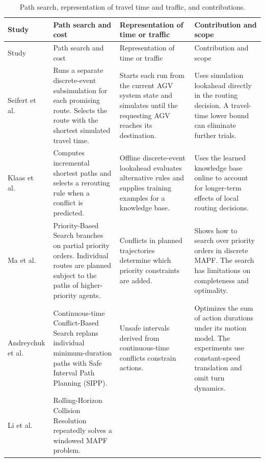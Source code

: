 \documentclass[11pt]{article}
\begin{document}
\small
\setlength{\tabcolsep}{4pt}
\begin{longtable}{@{}>{\raggedright\arraybackslash}p{.16\linewidth}
                    >{\raggedright\arraybackslash}p{.30\linewidth}
                    >{\raggedright\arraybackslash}p{.25\linewidth}
                    >{\raggedright\arraybackslash}p{.23\linewidth}@{}}
\caption{Path search, representation of travel time and traffic, and contributions.}
\label{tab:related-work}\\
\toprule
Study & Path search and cost & Representation of time or traffic & Contribution and scope \\
\midrule
\endfirsthead
\toprule
Study & Path search and cost & Representation of time or traffic & Contribution and scope \\
\midrule
\endhead
\bottomrule
\endfoot
Seifert et al.\ \cite{seifert1995} &
Runs a separate discrete-event subsimulation for each promising route.
Selects the route with the shortest simulated travel time. &
Starts each run from the current AGV system state and simulates
until the requesting AGV reaches its destination. &
Uses simulation lookahead directly in the routing decision.
A travel-time lower bound can eliminate further trials. \\ \addlinespace
Klaas et al.\ \cite{klaas2011} &
Computes incremental shortest paths and selects a rerouting rule
when a conflict is predicted. &
Offline discrete-event lookahead evaluates alternative rules
and supplies training examples for a knowledge base. &
Uses the learned knowledge base online to account for longer-term
effects of local routing decisions. \\ \addlinespace
Ma et al.\ \cite{ma2019} &
Priority-Based Search branches on partial priority orders. Individual routes
are planned subject to the paths of higher-priority agents. &
Conflicts in planned trajectories determine which priority constraints are added. &
Shows how to search over priority orders in discrete MAPF. The search has
limitations on completeness and optimality. \\ \addlinespace
Andreychuk et al.\ \cite{andreychuk2019} &
Continuous-time Conflict-Based Search replans individual minimum-duration
paths with Safe Interval Path Planning (SIPP). &
Unsafe intervals derived from continuous-time conflicts constrain actions. &
Optimizes the sum of action durations under its motion model. The experiments
use constant-speed translation and omit turn dynamics. \\ \addlinespace
Li et al.\ \cite{li2021} &
Rolling-Horizon Collision Resolution repeatedly solves a windowed MAPF problem. &

\end{longtable}
\end{document}
